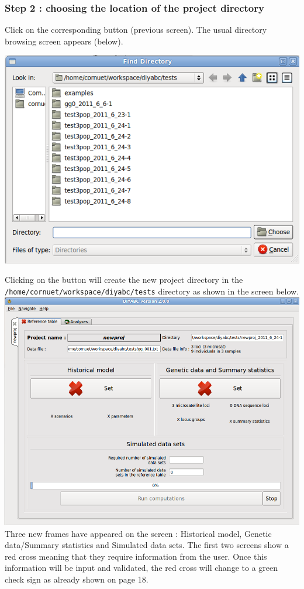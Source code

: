 \subsubsection{Step 2 : choosing the location of the project directory}
 Click on the corresponding  button (previous screen). The usual directory browsing screen appears (below). 
 
\includegraphics[scale=0.35]{gui_pictures/Capture-DIYABC-9.png} 
 
Clicking on the   button will create the new project directory in the \texttt{/home/cornuet/workspace/diyabc/tests} directory as shown in the screen below.\\  

\includegraphics[scale=0.35]{gui_pictures/Capture-DIYABC-10.png} 
 \vfill
 Three new frames have appeared on the screen : Historical model, Genetic data/Summary statistics and Simulated data sets. The first two screens show a red cross meaning that they require information from the user. Once this information will be input and validated, the red cross will change to a green check sign as already shown on page 18.
 
